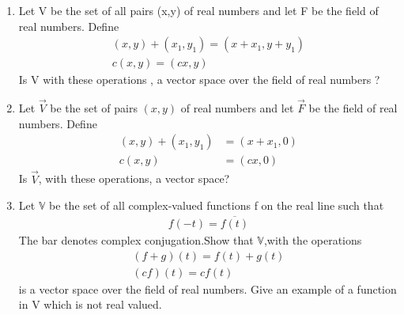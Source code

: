 \renewcommand{\theequation}{\theenumi}
\renewcommand{\thefigure}{\theenumi}
\begin{enumerate}[label=\thesubsection.\arabic*.,ref=\thesubsection.\theenumi]
%
\item Let V be the set of all pairs (x,y) of real numbers and let F be the field of real numbers. Define 
\begin{align}
(x,y)+(x_1,y_1)=(x+x_1,y+y_1)\\
c(x,y)=(cx,y)
\end{align}
Is V with these operations , a vector space over the field of real numbers ?
%
\\
\solution

%
\item Let $\vec{V}$ be the  set of pairs $(x,y)$ of real numbers and let $\vec{F}$ be the field of real numbers. Define
\begin{align}
    (x,y)+(x_1,y_1) &= (x+x_1,0) \label{eq:solutions/2/1/7/eq:eq1}\\
    c(x,y) &= (cx,0)
\end{align}
Is $\vec{V}$, with these operations, a vector space?
\\
\solution

%
\item    Let $\mathbb{V}$ be the set of all complex-valued functions f on the real line such that
   \begin{align}f(-t)=\overline{f(t)}\end{align}The bar denotes complex conjugation.Show that $\mathbb{V}$,with the operations\begin{align}(f+g)(t)=f(t)+g(t)\\(cf)(t)=cf(t)\end{align} is a vector space over the field of real numbers. Give an example of a function in V which is not real valued.
\\
\solution

%
\end{enumerate}



